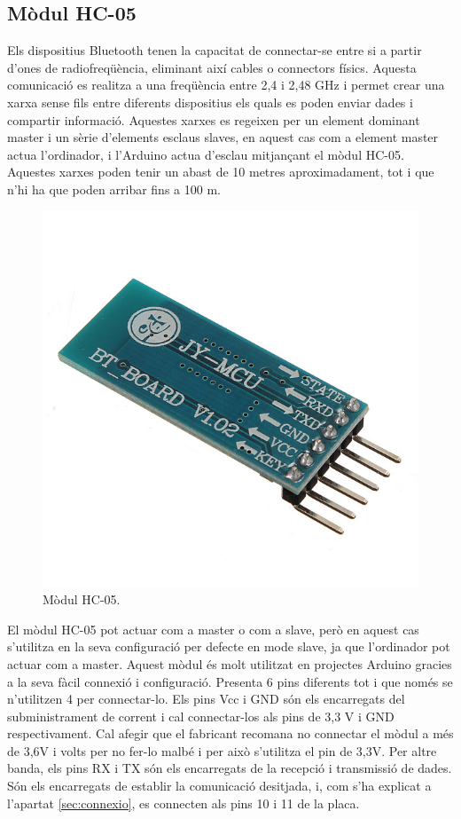 \subsection{Mòdul HC-05}

Els dispositius Bluetooth tenen la capacitat de connectar-se entre si a partir d’ones de radiofreqüència, eliminant així cables o connectors físics. Aquesta comunicació es realitza a una freqüència entre 2,4 i 2,48 GHz i permet crear una xarxa sense fils entre diferents dispositius els quals es poden enviar dades i compartir informació. Aquestes xarxes es regeixen per un element dominant master i un sèrie d’elements esclaus slaves, en aquest cas com a  element master actua l’ordinador, i l’Arduino actua d’esclau mitjançant el mòdul HC-05. Aquestes xarxes poden tenir un abast de 10 metres aproximadament, tot i que n’hi ha que poden arribar fins a 100 m. 

\begin{figure}[H]
	\centering
	\includegraphics[scale=0.3]{HC05}
	\caption{Mòdul HC-05.}
	\label{fig:HC05}
\end{figure}

El mòdul HC-05 pot actuar com a master o com a slave, però en aquest cas s’utilitza en la seva configuració per defecte en mode slave, ja que l’ordinador pot actuar com a master. Aquest mòdul és molt utilitzat en projectes Arduino gracies a la seva fàcil connexió i configuració. Presenta 6 pins diferents tot i que només se n’utilitzen 4 per connectar-lo. Els pins Vcc i GND són els encarregats del subministrament de corrent i cal connectar-los als pins de 3,3 V i GND respectivament. Cal afegir que el fabricant recomana no connectar el mòdul a més de 3,6V i volts per no fer-lo malbé i per això s’utilitza el pin de 3,3V. Per altre banda, els pins RX i TX són els encarregats de la recepció i transmissió de dades. Són els encarregats de establir la comunicació desitjada, i, com s’ha explicat a l’apartat \ref{sec:connexio}, es connecten als pins 10 i 11 de la placa. 

